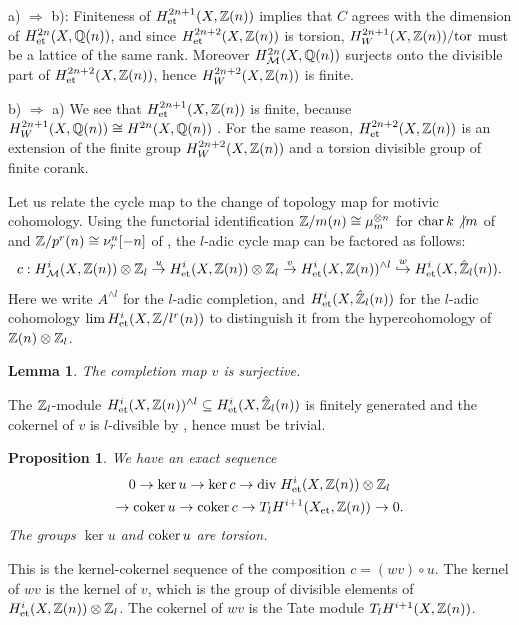 \documentclass[nospthms,envcountsect]{svmult} %
\newtheorem{lemma}      [theorem]       {Lemma}
\newtheorem{proposition}[theorem]       {Proposition}
\begin{document}
a) $\Rightarrow$ b): Finiteness of $H^{2n+1}_{\text{\rm et}}(X,{{\mathbb Z}}(n))$ 
implies that $C$ agrees with the dimension of $H^{2n}_{\text{\rm et}}(X,{{\mathbb Q}}(n))$,
and since $H^{2n+2}_{\text{\rm et}}(X,{{\mathbb Z}}(n))$ is torsion,
$H^{2n+1}_W(X,{{\mathbb Z}}(n))/{\text{\rm tor}}$ must be a lattice of the same rank.
Moreover $H^{2n}_{\mathcal M}(X,{{\mathbb Q}}(n))$ surjects onto the divisible part
of $H^{2n+2}_{\text{\rm et}}(X,{{\mathbb Z}}(n))$, hence $H^{2n+2}_W(X,{{\mathbb Z}}(n))$ is finite.

b) $\Rightarrow$ a) We see that $H^{2n+1}_{\text{\rm et}}(X,{{\mathbb Z}}(n))$
is finite, because $H^{2n+1}_W(X,{{\mathbb Q}}(n))\cong H^{2n}(X,{{\mathbb Q}}(n))$
\cite{ichweilI}. For the same reason, $H^{2n+2}_{\text{\rm et}}(X,{{\mathbb Z}}(n))$
is an extension of the finite group $H^{2n+2}_W(X,{{\mathbb Z}}(n))$ and 
a torsion divisible group of finite corank.
\proofend



Let us relate the cycle map to the change of topology map for
motivic cohomology. Using the
functorial identification ${{\mathbb Z}}/m(n)\cong \mu_m^{\otimes n}$ 
for $\operatorname{char} k\not| m$ of \cite{bkbl} and ${{\mathbb Z}}/p^r(n)\cong \nu_r^n[-n]$ of \cite{marcI}, 
the $l$-adic cycle map can be factored as follows:
$$ c:H^i_{\mathcal M}(X,{{\mathbb Z}}(n))\otimes{{\mathbb Z}}_l \stackrel{u}{\to} 
H^i_{\text{\rm et}}(X,{{\mathbb Z}}(n))\otimes{{\mathbb Z}}_l
\stackrel{v}{\to} H^i_{\text{\rm et}}(X,{{\mathbb Z}}(n))^{\wedge l} \stackrel{w}{\hookrightarrow} 
H^i_{\text{\rm et}}(X,\hat{{{\mathbb Z}}}_l(n)).$$
Here we write $A^{\wedge l}$ for the $l$-adic completion, and 
$H^i_{\text{\rm et}}(X,\hat{{{\mathbb Z}}}_l(n))$ for the $l$-adic
cohomology $\lim H^i_\et(X,\Z/l^r(n))$ to distinguish it from
the hypercohomology of ${{\mathbb Z}}(n)\otimes{{\mathbb Z}}_l$. 


\begin{lemma}
The completion map $v$ is surjective.
\end{lemma}

\proof
The ${{\mathbb Z}}_l$-module  
$H^i_{\text{\rm et}}(X,{{\mathbb Z}}(n))^{\wedge l}\subseteq H^i_{\text{\rm et}}(X,\hat{{{\mathbb Z}}}_l(n))$
is finitely generated and the cokernel of $v$ is 
$l$-divsible by \cite[(4.2)]{jannsencont}, hence must be trivial.
\proofend



\begin{proposition}
We have an exact sequence
\begin{multline*}
0\to \ker u\to \ker c\to {\rm div}\; H^i_{\text{\rm et}}(X,{{\mathbb Z}}(n))\otimes{{\mathbb Z}}_l \\
\to \operatorname{coker} u\to \operatorname{coker} c\to T_lH^{i+1}(X_{\text{\rm et}},{{\mathbb Z}}(n))\to 0.
\end{multline*}
The groups $\ker u$ and $\operatorname{coker} u$ are torsion.
\end{proposition}

\proof
This is the kernel-cokernel sequence of the composition
$c= (wv)\circ u$. The kernel of $wv$ is the kernel of $v$,
which is the group of divisible elements of $H^i_{\text{\rm et}}(X,{{\mathbb Z}}(n))\otimes {{\mathbb Z}}_l$.
The cokernel of $wv$ is the Tate module $T_lH^{i+1}(X,{{\mathbb Z}}(n))$.
\proofend
\end{document}
